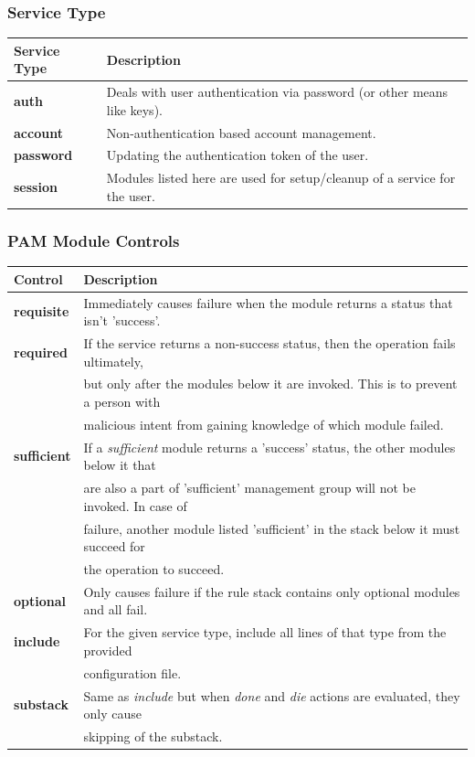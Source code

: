 \documentclass{report}
\begin{document}
	\subsubsection{Service Type}
	\vspace{-10pt}
	\begin{tabular}{ll}
		\toprule
		\textbf{Service Type} &\textbf{Description} \\
		\midrule
		\textbf{auth} &Deals with user authentication via password (or other means like keys). \\	
		\textbf{account} &Non-authentication based account management. \\	
		\textbf{password} &Updating the authentication token of the user. \\
		\textbf{session} &Modules listed here are used for setup/cleanup of a service for the user. \\
		\bottomrule
	\end{tabular}

	\subsubsection{PAM Module Controls}
	\vspace{-10pt}
	\begin{tabular}{ll}
		\toprule
		\textbf{Control} &\textbf{Description} \\
		\midrule
		\textbf{requisite} &Immediately causes failure when the module returns a status that isn't 'success'. \\	
		\textbf{required} &If the service returns a non-success status, then the operation fails ultimately, \\&but only after the modules below it are invoked. This is to prevent a person with \\&malicious intent from gaining knowledge of which module failed. \\	
		\textbf{sufficient} &If a \textit{sufficient} module returns a 'success' status, the other modules below it that \\&are also a part of 'sufficient' management group will not be invoked. In case of \\&failure, another module listed 'sufficient' in the stack below it must succeed for \\&the operation to succeed. \\
		\textbf{optional} &Only causes failure if the rule stack contains only optional modules and all fail. \\
		\midrule
		\textbf{include} &For the given service type, include all lines of that type from the provided \\&configuration file. \\
		\textbf{substack} &Same as \textit{include} but when \textit{done} and \textit{die} actions are evaluated, they only cause \\&skipping of the substack. \\
		\bottomrule
	\end{tabular}
	
\end{document}
